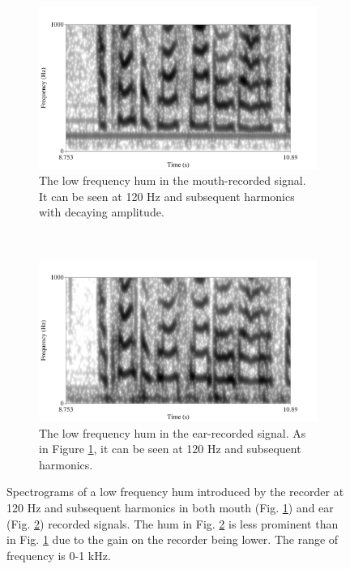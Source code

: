 \begin{figure}[H]
\centering
\begin{subfigure}{\textwidth}
  \centering
  \includegraphics[width=0.8\linewidth]{figure/low_frequency_hum.png}
  \caption{The low frequency hum in the mouth-recorded signal.  It can be seen at 120 Hz and subsequent harmonics with decaying amplitude.}
  \label{fig:low_freq_hum-mouth}
\end{subfigure}%
\\[2ex]
\begin{subfigure}{\textwidth}
  \centering
  \includegraphics[width=0.8\linewidth]{figure/low_frequency_hum-ear.png}
  \caption{The low frequency hum in the ear-recorded signal. As in Figure \ref{fig:low_freq_hum-mouth}, it can be seen at 120 Hz and subsequent harmonics.}
  \label{fig:low_freq_hum-ear}
\end{subfigure}
\caption{Spectrograms of a low frequency hum introduced by the recorder at 120 Hz and subsequent harmonics in both mouth (Fig. \ref{fig:low_freq_hum-mouth}) and ear (Fig. \ref{fig:low_freq_hum-ear}) recorded signals. The hum in Fig. \ref{fig:low_freq_hum-ear} is less prominent than in Fig. \ref{fig:low_freq_hum-mouth} due to the gain on the recorder being lower.  The range of frequency is 0-1 kHz.}
\label{fig:low_freq_hum}
\end{figure}

